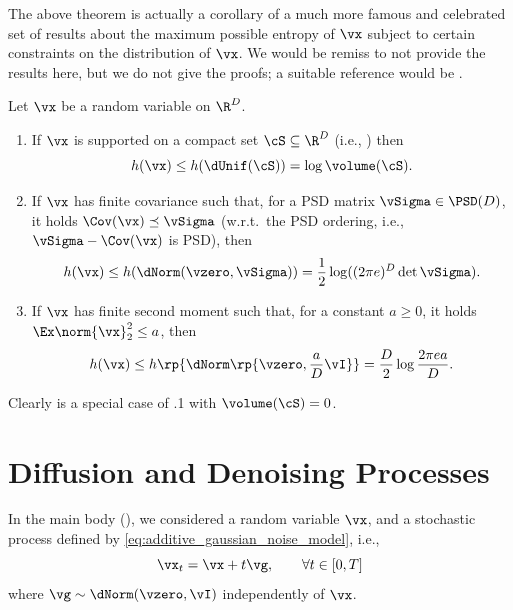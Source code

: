 \documentclass[../../book-main.tex]{subfiles}
\begin{document}
The above theorem is actually a corollary of a much more famous and celebrated set of results about the maximum possible entropy of \(\vx\) subject to certain constraints on the distribution of \(\vx\). We would be remiss to not provide the results here, but we do not give the proofs; a suitable reference would be \cite{poliyanski2024information}.
\begin{theorem}\label{thmx:max_entropy}
    Let \(\vx\) be a random variable on \(\R^{D}\).
    \begin{enumerate}
        \item If \(\vx\) is supported on a compact set \(\cS \subseteq \R^{D}\) (i.e., ) then
        \begin{equation}
            h(\vx) \leq h(\dUnif(\cS)) = \log \volume(\cS).
        \end{equation}
        \item If \(\vx\) has finite covariance such that, for a PSD matrix \(\vSigma \in \PSD(D)\), it holds \(\Cov(\vx) \preceq \vSigma\) (w.r.t.~the PSD ordering, i.e., \(\vSigma - \Cov(\vx)\) is PSD), then
        \begin{equation}
            h(\vx) \leq h(\dNorm(\vzero, \vSigma)) = \frac{1}{2}\log((2\pi e)^{D}\det\vSigma).
        \end{equation}
        \item If \(\vx\) has finite second moment such that, for a constant \(a \geq 0\), it holds \(\Ex\norm{\vx}_{2}^{2} \leq a\), then
        \begin{equation}
            h(\vx) \leq h\rp{\dNorm\rp{\vzero, \frac{a}{D}\vI}} = \frac{D}{2}\log\frac{2\pi e a}{D}.
        \end{equation}
    \end{enumerate}
\end{theorem}
Clearly  is a special case of .1 with \(\volume(\cS) = 0\).



\section{Diffusion and Denoising Processes}\label{sec:entropy_diffusion}

In the main body (), we considered a random variable \(\vx\), and a stochastic process defined by \eqref{eq:additive_gaussian_noise_model}, i.e.,
\begin{equation}\label{eq:app_additive_gaussian_noise_model}
    \vx_{t} = \vx + t\vg, \qquad  \forall t \in [0, T]
\end{equation}
where \(\vg \sim \dNorm(\vzero, \vI)\) independently of \(\vx\). 
\end{document}

